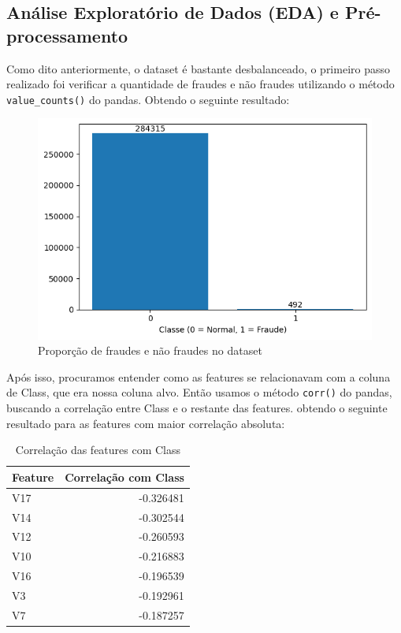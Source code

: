 \documentclass[conference]{IEEEtran}
\begin{document}
\subsection{Análise Exploratório de Dados (EDA) e Pré-processamento}
\label{subsec:eda}
  Como dito anteriormente, o dataset é bastante desbalanceado, o primeiro passo realizado foi verificar a quantidade de fraudes e não fraudes utilizando o método \texttt{value\_counts()} do pandas. Obtendo o seguinte resultado:
  \begin{figure}[H]
    \centerline{\includegraphics[width=0.8\linewidth]{../output/proporcao_dados.png}}
    \caption{Proporção de fraudes e não fraudes no dataset}
    \label{fig:proporcao_dados}
  \end{figure}
  Após isso, procuramos entender como as features se relacionavam com a coluna de Class, que era nossa coluna alvo. Então usamos o método \texttt{corr()} do pandas, buscando a correlação entre Class e o restante das features. obtendo o seguinte resultado para as features com maior correlação absoluta:
  \begin{table}[tb]
      \caption{Correlação das features com Class}
      \label{tab:correlacao_features}
      \centering
      \begin{tabular}{lr}
          \toprule
          \textbf{Feature} & \textbf{Correlação com Class} \\
          \midrule
          V17    & -0.326481 \\
          V14    & -0.302544 \\
          V12    & -0.260593 \\
          V10    & -0.216883 \\
          V16    & -0.196539 \\
          V3     & -0.192961 \\
          V7     & -0.187257 \\
          \bottomrule
      \end{tabular}
  \end{table}
\end{document}
